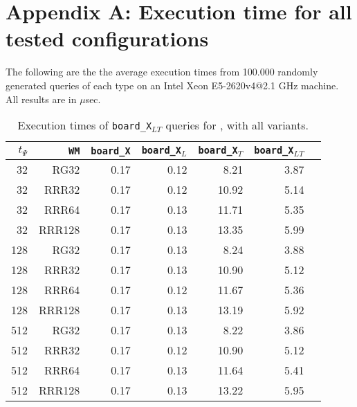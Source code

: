 \appendix
\chapter*{Appendix A: Execution time for all tested configurations}
\label{app:times}
The following are the the average execution times from 100.000 randomly generated queries of each type on an Intel Xeon E5-2620v4@2.1 GHz machine. All results are in $\mu$sec.


\begin{table}[hpt!]
\caption{Execution times of \texttt{board\_X$_{LT}$} queries for \ttctr, with all variants.}
\begin{tabular}{|r|r|r|r|r|r|r|}
\hline
$t_{\Psi}$ & \texttt{WM} & \texttt{board\_X} & \texttt{board\_X$_{L}$} & \texttt{board\_X$_{T}$} & \texttt{board\_X$_{LT}$} \\
\hline
32 & RG32 & 0.17 & 0.12 & 8.21 & 3.87 \\
32 & RRR32 & 0.17 & 0.12 & 10.92 & 5.14 \\
32 & RRR64 & 0.17 & 0.13 & 11.71 & 5.35 \\
32 & RRR128 & 0.17 & 0.13 & 13.35 & 5.99 \\
128 & RG32 & 0.17 & 0.13 & 8.24 & 3.88 \\
128 & RRR32 & 0.17 & 0.13 & 10.90 & 5.12 \\
128 & RRR64 & 0.17 & 0.12 & 11.67 & 5.36 \\
128 & RRR128 & 0.17 & 0.13 & 13.19 & 5.92 \\
512 & RG32 & 0.17 & 0.13 & 8.22 & 3.86 \\
512 & RRR32 & 0.17 & 0.12 & 10.90 & 5.12 \\
512 & RRR64 & 0.17 & 0.13 & 11.64 & 5.41 \\
512 & RRR128 & 0.17 & 0.13 & 13.22 & 5.95 \\
\hline
\end{tabular}
\end{table}

